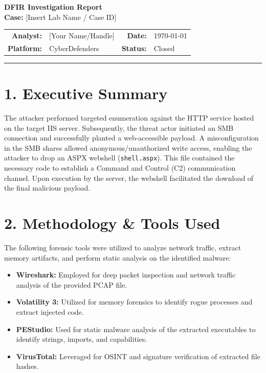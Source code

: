 \documentclass[11pt, a4paper]{article}
\begin{document}
\begin{center}
    {\huge \textbf{\textcolor{primary}{DFIR Investigation Report}}}\\[0.4cm]
    {\Large \textbf{Case:} [Insert Lab Name / Case ID]}\\[0.4cm]
    \begin{tabular}{r l | r l}
        \textbf{Analyst:} & [Your Name/Handle] & \textbf{Date:} & \today \\
        \textbf{Platform:} & CyberDefenders & \textbf{Status:} & Closed \\
    \end{tabular}
    \vspace{0.3cm}
    \hrule
\end{center}
\vspace{0.5cm}

\section*{\textcolor{primary}{1. Executive Summary}}
The attacker performed targeted enumeration against the HTTP service hosted on the target IIS server. Subsequently, the threat actor initiated an SMB connection and successfully planted a web-accessible payload. A misconfiguration in the SMB shares allowed anonymous/unauthorized write access, enabling the attacker to drop an ASPX webshell (\texttt{shell.aspx}). This file contained the necessary code to establish a Command and Control (C2) communication channel. Upon execution by the server, the webshell facilitated the download of the final malicious payload.

\section*{\textcolor{primary}{2. Methodology \& Tools Used}}
The following forensic tools were utilized to analyze network traffic, extract memory artifacts, and perform static analysis on the identified malware:
\begin{itemize}[label=\textcolor{secondary}{$\bullet$}, itemsep=2pt]
    \item \textbf{Wireshark:} Employed for deep packet inspection and network traffic analysis of the provided PCAP file.
    \item \textbf{Volatility 3:} Utilized for memory forensics to identify rogue processes and extract injected code.
    \item \textbf{PEStudio:} Used for static malware analysis of the extracted executables to identify strings, imports, and capabilities.
    \item \textbf{VirusTotal:} Leveraged for OSINT and signature verification of extracted file hashes.
\end{itemize}
\end{document}
